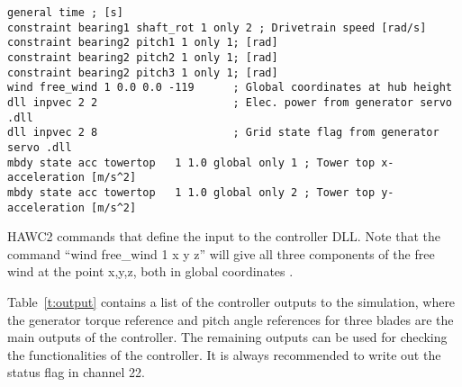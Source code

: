 \begin{table}[t]
\center
\begin{verbatim}
general time ; [s]     
constraint bearing1 shaft_rot 1 only 2 ; Drivetrain speed [rad/s]
constraint bearing2 pitch1 1 only 1; [rad]         
constraint bearing2 pitch2 1 only 1; [rad]                               
constraint bearing2 pitch3 1 only 1; [rad]                               
wind free_wind 1 0.0 0.0 -119      ; Global coordinates at hub height
dll inpvec 2 2                     ; Elec. power from generator servo .dll
dll inpvec 2 8                     ; Grid state flag from generator servo .dll
mbdy state acc towertop   1 1.0 global only 1 ; Tower top x-acceleration [m/s^2]
mbdy state acc towertop   1 1.0 global only 2 ; Tower top y-acceleration [m/s^2]
\end{verbatim}
\caption{HAWC2 commands that define the input to the controller DLL. Note that the command ``wind free\_wind 1 x y z'' will give all three components of the free wind at the point x,y,z, both in global coordinates \cite{Larsen12}. \label{t:input}}
\end{table}

Table~\ref{t:output} contains a list of the controller outputs to the simulation, where the generator torque reference and pitch angle references for three blades are the main outputs of the controller. The remaining outputs can be used for checking the functionalities of the controller. It is always recommended to write out the status flag in channel 22.

